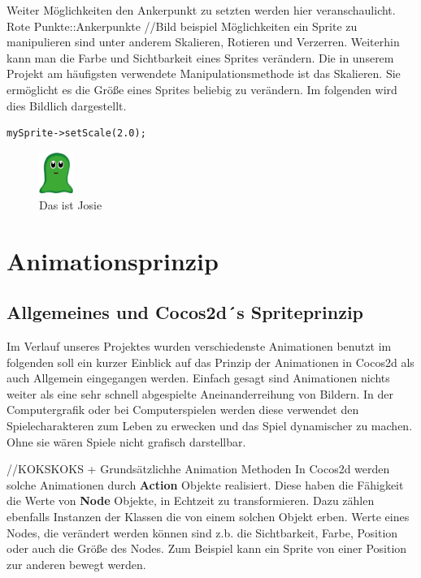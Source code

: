 Weiter Möglichkeiten den Ankerpunkt zu setzten werden hier veranschaulicht. Rote Punkte::Ankerpunkte
//Bild beispiel
Möglichkeiten ein Sprite zu manipulieren sind unter anderem Skalieren, Rotieren und Verzerren. Weiterhin kann man die Farbe und Sichtbarkeit eines Sprites verändern. Die in unserem Projekt am häufigsten verwendete Manipulationsmethode ist das Skalieren. Sie ermöglicht es die Größe eines Sprites beliebig zu verändern. Im folgenden wird dies Bildlich dargestellt. 

\begin{lstlisting}[style=singleline]
mySprite->setScale(2.0);
\end{lstlisting}



\begin{figure}[h]
  \includegraphics[width=0.1\textwidth]{resources/josie}
  \caption{Das ist Josie}
  \label{fig:josie} 
\end{figure}

\section{Animationsprinzip}

\subsection{Allgemeines und Cocos2d´s Spriteprinzip}
Im Verlauf unseres Projektes wurden verschiedenste Animationen benutzt im folgenden soll ein kurzer Einblick auf das Prinzip der Animationen in Cocos2d als auch Allgemein  eingegangen werden. Einfach gesagt sind Animationen nichts weiter als eine sehr schnell abgespielte Aneinanderreihung von Bildern. In der Computergrafik oder bei Computerspielen werden diese verwendet den Spielecharakteren zum Leben zu erwecken und das Spiel dynamischer zu machen. Ohne sie wären Spiele nicht grafisch darstellbar.

//KOKSKOKS + Grundsätzlichhe Animation Methoden
In Cocos2d werden solche Animationen durch \textbf{Action} Objekte realisiert. Diese haben die Fähigkeit die Werte von \textbf{Node} Objekte, in Echtzeit zu transformieren. Dazu zählen ebenfalls Instanzen der Klassen die von einem solchen Objekt erben. Werte eines Nodes, die verändert werden können sind z.b. die Sichtbarkeit, Farbe, Position oder auch die Größe des Nodes. Zum Beispiel kann ein Sprite von einer Position zur anderen bewegt werden.


